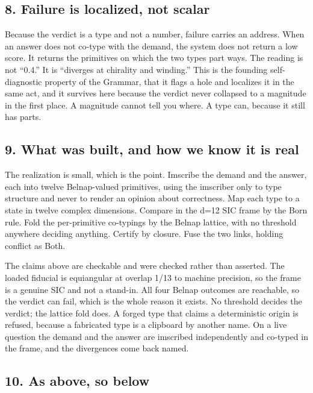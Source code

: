 \hypertarget{failure-is-localized-not-scalar}{%
\subsection{8. Failure is localized, not
scalar}\label{failure-is-localized-not-scalar}}

Because the verdict is a type and not a number, failure carries an
address. When an answer does not co-type with the demand, the system
does not return a low score. It returns the primitives on which the two
types part ways. The reading is not ``0.4.'' It is ``diverges at
chirality and winding.'' This is the founding self-diagnostic property
of the Grammar, that it flags a hole and localizes it in the same act,
and it survives here because the verdict never collapsed to a magnitude
in the first place. A magnitude cannot tell you where. A type can,
because it still has parts.

\hypertarget{what-was-built-and-how-we-know-it-is-real}{%
\subsection{9. What was built, and how we know it is
real}\label{what-was-built-and-how-we-know-it-is-real}}

The realization is small, which is the point. Imscribe the demand and
the answer, each into twelve Belnap-valued primitives, using the
imscriber only to type structure and never to render an opinion about
correctness. Map each type to a state in twelve complex dimensions.
Compare in the d=12 SIC frame by the Born rule. Fold the per-primitive
co-typings by the Belnap lattice, with no threshold anywhere deciding
anything. Certify by closure. Fuse the two links, holding conflict as
Both.

The claims above are checkable and were checked rather than asserted.
The loaded fiducial is equiangular at overlap 1/13 to machine precision,
so the frame is a genuine SIC and not a stand-in. All four Belnap
outcomes are reachable, so the verdict can fail, which is the whole
reason it exists. No threshold decides the verdict; the lattice fold
does. A forged type that claims a deterministic origin is refused,
because a fabricated type is a clipboard by another name. On a live
question the demand and the answer are imscribed independently and
co-typed in the frame, and the divergences come back named.

\hypertarget{as-above-so-below}{%
\subsection{10. As above, so below}\label{as-above-so-below}}

